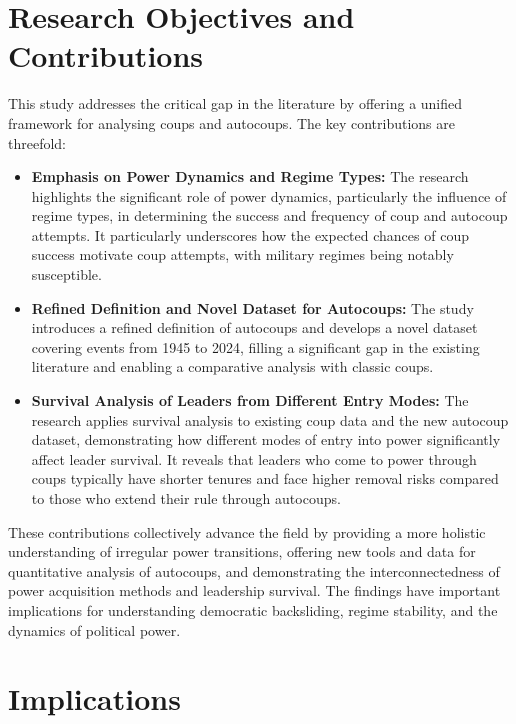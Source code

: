 \documentclass[
  12pt,
]{report}
\begin{document}
\section{Research Objectives and
Contributions}\label{research-objectives-and-contributions}

This study addresses the critical gap in the literature by offering a
unified framework for analysing coups and autocoups. The key
contributions are threefold:

\begin{itemize}
\item
  \textbf{Emphasis on Power Dynamics and Regime Types:} The research
  highlights the significant role of power dynamics, particularly the
  influence of regime types, in determining the success and frequency of
  coup and autocoup attempts. It particularly underscores how the
  expected chances of coup success motivate coup attempts, with military
  regimes being notably susceptible.
\item
  \textbf{Refined Definition and Novel Dataset for Autocoups:} The study
  introduces a refined definition of autocoups and develops a novel
  dataset covering events from 1945 to 2024, filling a significant gap
  in the existing literature and enabling a comparative analysis with
  classic coups.
\item
  \textbf{Survival Analysis of Leaders from Different Entry Modes:} The
  research applies survival analysis to existing coup data and the new
  autocoup dataset, demonstrating how different modes of entry into
  power significantly affect leader survival. It reveals that leaders
  who come to power through coups typically have shorter tenures and
  face higher removal risks compared to those who extend their rule
  through autocoups.
\end{itemize}

These contributions collectively advance the field by providing a more
holistic understanding of irregular power transitions, offering new
tools and data for quantitative analysis of autocoups, and demonstrating
the interconnectedness of power acquisition methods and leadership
survival. The findings have important implications for understanding
democratic backsliding, regime stability, and the dynamics of political
power.

\section{Implications}\label{implications}
\end{document}
